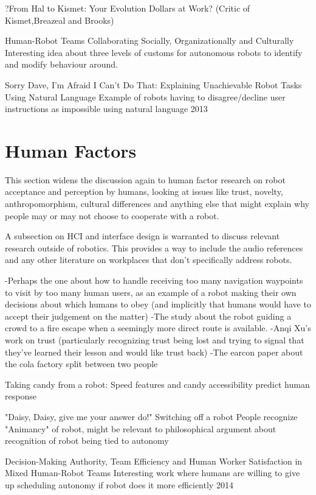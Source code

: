 \documentclass{sfuthesis}
\begin{document}
?From Hal to Kismet: Your Evolution Dollars at Work? (Critic of Kismet,Breazeal and Brooks)

Human-Robot Teams Collaborating Socially, Organizationally and Culturally	Interesting idea about three levels of customs for autonomous robots to identify and modify behaviour around.	

Sorry Dave, I'm Afraid I Can't Do That: Explaining Unachievable Robot Tasks Using Natural Language	Example of robots having to disagree/decline user instructions as impossible using natural language	2013

\section{Human Factors}

This section widens the discussion again to human factor research on robot acceptance and perception by humans, looking at issues like trust, novelty, anthropomorphism, cultural differences and anything else that might explain why people may or may not choose to cooperate with a robot.

A subsection on HCI and interface design is warranted to discuss relevant research outside of robotics. This provides a way to include the audio references and any other literature on workplaces that don't specifically address robots. 


-Perhaps the one about how to handle receiving too many navigation waypoints to visit by too many human users, as an example of a robot making their own decisions about which humans to obey (and implicitly that humans would have to accept their judgement on the matter)
-The study about the robot guiding a crowd to a fire escape when a seemingly more direct route is available.
-Anqi Xu's work on trust (particularly recognizing trust being lost and trying to signal that they've learned their lesson and would like trust back)
-The earcon paper about the cola factory split between two people

Taking candy from a robot: Speed features and candy accessibility predict human response


"Daisy, Daisy, give me your answer do!" Switching off a robot	People recognize "Animancy" of robot, might be relevant to philosophical argument about recognition of robot being tied to autonomy	

Decision-Making Authority, Team Efficiency and Human Worker Satisfaction in Mixed Human-Robot Teams	Interesting work where humans are willing to give up scheduling autonomy if robot does it more efficiently	2014
\end{document}
